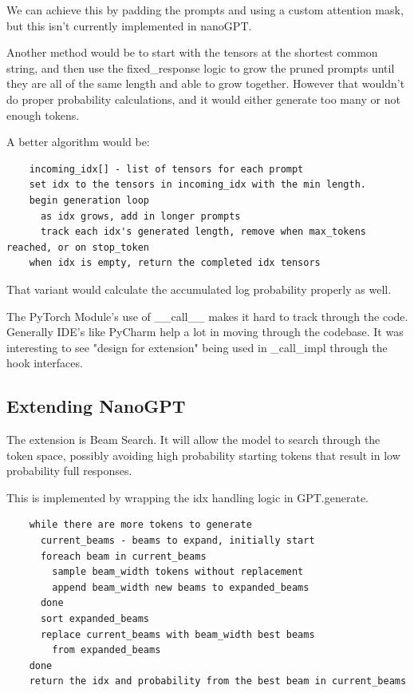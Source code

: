 \documentclass[11pt]{article}
\begin{document}
We can achieve this by padding the prompts and using a custom attention mask, but this isn't currently implemented in nanoGPT. 

Another method would be to start with the tensors at the shortest common string, and then use the fixed\_response logic to grow the pruned prompts until they are all of the same length and able to grow together. However that wouldn't do proper probability calculations, and it would either generate too many or not enough tokens.

A better algorithm would be:

\begin{lstlisting}
	incoming_idx[] - list of tensors for each prompt
	set idx to the tensors in incoming_idx with the min length.
	begin generation loop
	  as idx grows, add in longer prompts
	  track each idx's generated length, remove when max_tokens reached, or on stop_token
	when idx is empty, return the completed idx tensors
\end{lstlisting}

That variant would calculate the accumulated log probability properly as well.

The PyTorch Module's use of \_\_call\_\_ makes it hard to track through the code. Generally IDE's like PyCharm help a lot in moving through the codebase. It was interesting to see "design for extension" being used in \_call\_impl through the hook interfaces.

\subsection{Extending NanoGPT}

The extension is Beam Search. It will allow the model to search through the token space, possibly avoiding high probability starting tokens that result in low probability full responses.

This is implemented by wrapping the idx handling logic in GPT.generate. 

\begin{lstlisting}
	while there are more tokens to generate
	  current_beams - beams to expand, initially start
	  foreach beam in current_beams
	    sample beam_width tokens without replacement
	    append beam_width new beams to expanded_beams
	  done
	  sort expanded_beams
	  replace current_beams with beam_width best beams
	    from expanded_beams 
	done
	return the idx and probability from the best beam in current_beams
\end{lstlisting}
\end{document}
